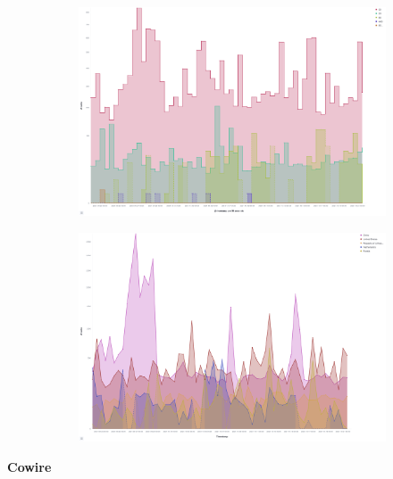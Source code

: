 \begin{figure}
    \centering
   
    \begin{subfigure}[b]{0.49\textwidth}
        \centering
        \includegraphics[width=\textwidth]{figures/tpot-cowire-attacks.png}
        \caption{}
        \label{fig:tpot-cowire-attacks}
    \end{subfigure}
    \hfill
    \begin{subfigure}[b]{0.49\textwidth}
        \centering
        \includegraphics[width=\textwidth]{figures/tpot-cowire-country.png}
        \caption{}
        \label{fig:tpot-cowire-country}
    \end{subfigure}
    \caption[]{}
    \label{fig:cowire}
\end{figure}


\textbf{Cowire} 

